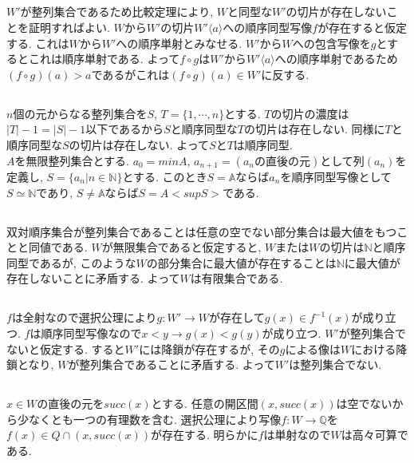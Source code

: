 \documentclass{jsarticle}
\begin{document}
\subsection{} %
$W'$が整列集合であるため比較定理により, $W$と同型な$W'$の切片が存在しないことを証明すればよい. $W$から$W'$の切片$W'\langle a \rangle$への順序同型写像$f$が存在すると仮定する. これは$W$から$W'$への順序単射とみなせる. $W'$から$W$への包含写像を$g$とするとこれは順序単射である. よって$f \circ g$は$W'$から$W'\langle a \rangle$への順序単射であるため$(f \circ g)(a) > a$であるがこれは$(f \circ g)(a) \in W'$に反する.

\subsection{} %
$n$個の元からなる整列集合を$S$, $T = \{1, \cdots, n\}$とする. $T$の切片の濃度は$|T| - 1 = |S| - 1$以下であるから$S$と順序同型な$T$の切片は存在しない. 同様に$T$と順序同型な$S$の切片は存在しない. よって$S$と$T$は順序同型.\\
$A$を無限整列集合とする. $a_0 = min A$, $a_{n + 1} = (a_nの直後の元)$として列$(a_n)$を定義し, $S = \{a_n | n \in \mathbb{N}\}$とする. このとき$S = \mathbb{A}$ならば$a_n$を順序同型写像として$S \simeq \mathbb{N}$であり, $S \neq \mathbb{A}$ならば$S = A<sup S>$である.

\subsection{} %
双対順序集合が整列集合であることは任意の空でない部分集合は最大値をもつことと同値である. $W$が無限集合であると仮定すると, $W$または$W$の切片は$\mathbb{N}$と順序同型であるが, このような$W$の部分集合に最大値が存在することは$\mathbb{N}$に最大値が存在しないことに矛盾する. よって$W$は有限集合である.

\subsection{} %
$f$は全射なので選択公理により$g:W' \rightarrow W$が存在して$g(x) \in f^{-1}(x)$が成り立つ. $f$は順序同型写像なので$x < y \rightarrow g(x) < g(y)$が成り立つ. $W'$が整列集合でないと仮定する. すると$W'$には降鎖が存在するが, その$g$による像は$W$における降鎖となり, $W$が整列集合であることに矛盾する. よって$W'$は整列集合でない.

\subsection{} %
$x \in W$の直後の元を$succ(x)$とする. 任意の開区間$(x, succ(x))$は空でないから少なくとも一つの有理数を含む. 選択公理により写像$f:W \rightarrow \mathbb{Q}$を$f(x) \in Q \cap (x, succ(x))$が存在する. 明らかに$f$は単射なので$W$は高々可算である.
\end{document}
